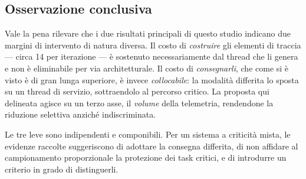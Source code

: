 \subsection{Osservazione conclusiva}

Vale la pena rilevare che i due risultati principali di questo studio indicano due margini di
intervento di natura diversa. Il costo di \emph{costruire} gli elementi di traccia --- circa 14\us{}
per iterazione --- \`e sostenuto necessariamente dal thread che li genera e non \`e eliminabile per
via architetturale. Il costo di \emph{consegnarli}, che come si \`e visto \`e di gran lunga
superiore, \`e invece \emph{collocabile}: la modalit\`a differita lo sposta su un thread di
servizio, sottraendolo al percorso critico. La proposta qui delineata agisce su un terzo asse, il
\emph{volume} della telemetria, rendendone la riduzione selettiva anzich\'e indiscriminata.

Le tre leve sono indipendenti e componibili. Per un sistema a criticit\`a mista, le evidenze
raccolte suggeriscono di adottare la consegna differita, di non affidare al campionamento
proporzionale la protezione dei task critici, e di introdurre un criterio in grado di distinguerli.


